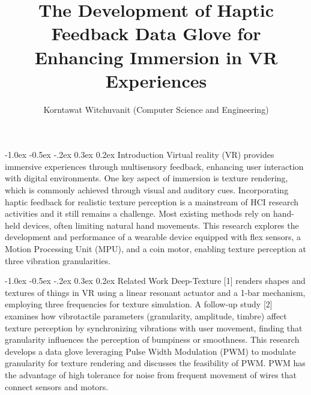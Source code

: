 \documentclass[a4paper,twocolumn]{article}
\title{\textbf{The Development of Haptic Feedback Data Glove for Enhancing Immersion in VR Experiences}}
\author{\small{Korntawat Witchuvanit (Computer Science and Engineering)}}
\date{\vspace{-3em}}
\begin{document}
\small
\maketitle

\makeatletter
\renewcommand\section{\@startsection{section}{1}{\z@}%
  {-1.0ex \@plus -0.5ex \@minus -.2ex}%
  {0.3ex \@plus 0.2ex}%
  {\normalfont\small\bfseries}}
\makeatother



\section{Introduction}
Virtual reality (VR) provides immersive experiences through multisensory feedback, enhancing user interaction with digital environments. One key aspect of immersion is texture rendering, which is commonly achieved through visual and auditory cues. Incorporating haptic feedback for realistic texture perception is a mainstream of HCI research activities and it still remains a challenge. Most existing methods rely on hand-held devices, often limiting natural hand movements. This research explores the development and performance of a wearable device equipped with flex sensors, a Motion Processing Unit (MPU), and a coin motor, enabling texture perception at three vibration granularities.

\section{Related Work}
Deep-Texture [1] renders shapes and textures of things in VR using a linear resonant actuator and a 1-bar mechanism, employing three frequencies for texture simulation. A follow-up study [2] examines how vibrotactile parameters (granularity, amplitude, timbre) affect texture perception by synchronizing vibrations with user movement, finding that granularity influences the perception of bumpiness or smoothness. This research develops a data glove leveraging Pulse Width Modulation (PWM) to modulate granularity for texture rendering and discusses the feasibility of PWM. PWM has the advantage of high tolerance for noise from frequent movement of wires that connect sensors and motors.
\end{document}
